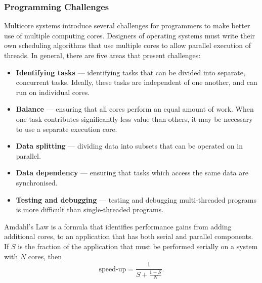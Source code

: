 \documentclass{article}
\begin{document}
\subsubsection{Programming Challenges}
Multicore systems introduce several challenges for programmers to make
better use of multiple computing cores. Designers of operating systems
must write their own scheduling algorithms that use multiple cores to
allow parallel execution of threads. In general, there are five areas
that present challenges:
\begin{itemize}
    \item \textbf{Identifying tasks} --- identifying tasks that can be
          divided into separate, concurrent tasks. Ideally, these tasks
          are independent of one another, and can run on individual
          cores.
    \item \textbf{Balance} --- ensuring that all cores perform an equal
          amount of work. When one task contributes significantly less
          value than others, it may be necessary to use a separate
          execution core.
    \item \textbf{Data splitting} --- dividing data into subsets that
          can be operated on in parallel.
    \item \textbf{Data dependency} --- ensuring that tasks which access
          the same data are synchronised.
    \item \textbf{Testing and debugging} --- testing and debugging
          multi-threaded programs is more difficult than single-threaded
          programs.
\end{itemize}
\begin{tcolorboxlarge}[title={Amdahl's Law}, parbox=false]
    Amdahl's Law is a formula that identifies performance gains from
    adding additional cores, to an application that has both serial
    and parallel components. If \(S\) is the fraction of the application
    that must be performed serially on a system with \(N\) cores, then
    \begin{equation*}
        \text{speed-up} = \frac{1}{S + \frac{1 - S}{N}}.
    \end{equation*}
\end{tcolorboxlarge}
\end{document}

